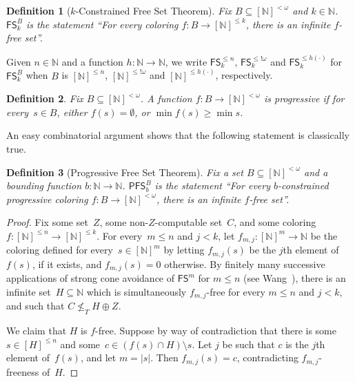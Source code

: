 \documentclass[10pt,a4paper]{article}
\newcommand{\FS}[0]{\mathsf{FS}}
\newcommand{\PFS}[0]{\mathsf{PFS}}
\newcommand{\NN}[0]{\mathbb{N}}
\def\qt#1{``#1''}%
\newtheorem{theorem}{Theorem}
\numberwithin{theorem}{section}
\newtheorem{proposition}[theorem]{Proposition}
\newtheorem{definition}[theorem]{Definition}
\begin{document}
\begin{definition}[$k$-Constrained Free Set Theorem]
Fix $B \subseteq [\NN]^{<\omega}$ and $k \in \NN$.
$\FS^B_k$ is the statement \qt{For every coloring  $f : B \to [\NN]^{\leq k}$, there is an infinite $f$-free set}.
\end{definition}

Given $n \in \NN$ and a function $h : \NN \to \NN$, we write $\FS^{\leq n}_k$, $\FS^{\leq !\omega}_k$ and $\FS^{\leq h(\cdot)}_k$ for $\FS^B_k$ when $B$ is $[\NN]^{\leq n}$, $[\NN]^{\leq !\omega}$ and $[\NN]^{\leq h(\cdot)}$, respectively.

\begin{definition}
Fix $B \subseteq [\NN]^{<\omega}$.
A function $f : B \to [\NN]^{<\omega}$ is \emph{progressive} if for every~$s \in B$, either $f(s) = \emptyset$, or $\min f(s)\geq \min s$.
\end{definition}

An easy combinatorial argument shows that the following statement is classically true.


\begin{definition}[Progressive Free Set Theorem]
Fix a set $B \subseteq [\NN]^{<\omega}$ and a bounding function $b : \NN \to \NN$.
$\PFS^B_b$ is the statement \qt{For every $b$-constrained progressive coloring $f : B \to [\NN]^{<\omega}$, there is an infinite $f$-free set}.
\end{definition}


\begin{proof}
Fix some set~$Z$, some non-$Z$-computable set~$C$, and some coloring $f : [\NN]^{\leq n} \to [\NN]^{\leq k}$.
For every~$m \leq n$ and $j < k$, let $f_{m, j} : [\NN]^m \to \NN$ be the coloring defined for every~$s \in [\NN]^m$ by letting $f_{m, j}(s)$ be the $j$th element of~$f(s)$, if it exists, and $f_{m, j}(s) = 0$ otherwise. By finitely many successive applications of strong cone avoidance of $\FS^m$ for $m \leq n$ (see Wang~\cite{wang2014some}), there is an infinite set~$H \subseteq \NN$ which is simultaneously $f_{m,j}$-free for every $m \leq n$ and $j < k$, and such that $C \not \leq_T H \oplus Z$.

We claim that $H$ is $f$-free. Suppose by way of contradiction that there is some~$s \in [H]^{\leq n}$ and some~$c \in (f(s) \cap H) \setminus s$. %
Let $j$ be such that $c$ is the $j$th element of~$f(s)$, and let $m = |s|$. Then $f_{m,j}(s) = c$, contradicting $f_{m,j}$-freeness of~$H$.
\end{proof}
\end{document}
